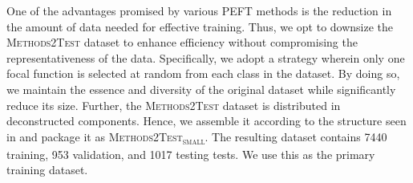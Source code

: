 \documentclass[12pt]{book}
\begin{document}
One of the advantages promised by various PEFT methods is the reduction in the amount of data needed for effective training. Thus, we opt to downsize the \textsc{Methods2Test} dataset to enhance efficiency without compromising the representativeness of the data. Specifically, we adopt a strategy wherein only one focal function is selected at random from each class in the dataset. By doing so, we maintain the essence and diversity of the original dataset while significantly reduce its size. Further, the \textsc{Methods2Test} dataset is distributed in deconstructed components. Hence, we assemble it according to the structure seen in  and package it as \textsc{Methods2Test\textsubscript{small}}. The resulting dataset contains 7440 training, 953 validation, and 1017 testing tests. We use this as the primary training dataset.
\end{document}
